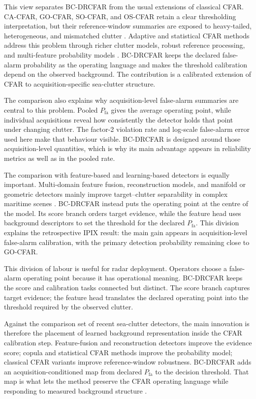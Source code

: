 \documentclass[preprint,12pt]{elsarticle}
\begin{document}
This view separates BC-DRCFAR from the usual extensions of classical CFAR.
CA-CFAR, GO-CFAR, SO-CFAR, and OS-CFAR retain a clear thresholding
interpretation, but their reference-window summaries are exposed to heavy-tailed,
heterogeneous, and mismatched clutter
\cite{hansen1980go,rohling1983cfar,barkat1989multiple}. Adaptive and statistical
CFAR methods address this problem through richer clutter models, robust
reference processing, and multi-feature probability models
\cite{xue2022adaptive,zhao2019dbscan,wen2024gev,li2025copula,jiang2025twodcfar}.
BC-DRCFAR keeps the declared false-alarm probability as the operating language
and makes the threshold calibration depend on the observed background. The
contribution is a calibrated extension of CFAR to acquisition-specific
sea-clutter structure.

The comparison also explains why acquisition-level false-alarm summaries are
central to this problem. Pooled $P_{\mathrm{fa}}$ gives the average operating
point, while individual acquisitions reveal how consistently the detector holds
that point under changing clutter. The factor-2 violation rate and log-scale
false-alarm error used here make that behaviour visible. BC-DRCFAR is designed
around those acquisition-level quantities, which is why its main advantage
appears in reliability metrics as well as in the pooled rate.

The comparison with feature-based and learning-based detectors is equally
important. Multi-domain feature fusion, reconstruction models, and manifold or
geometric detectors mainly improve target--clutter separability in complex
maritime scenes \cite{wen2022spatiotemporal,wang2025twostage,chen2026mspmig}.
BC-DRCFAR instead puts the operating point at the centre of the model. Its score
branch orders target evidence, while the feature head uses background
descriptors to set the threshold for the declared $P_{\mathrm{fa}}$. This
division explains the retrospective IPIX result: the main gain appears in
acquisition-level false-alarm calibration, with the primary detection
probability remaining close to GO-CFAR.

This division of labour is useful for radar deployment. Operators choose a
false-alarm operating point because it has operational meaning. BC-DRCFAR keeps
the score and calibration tasks connected but distinct. The score branch
captures target evidence; the feature head translates the declared operating
point into the threshold required by the observed clutter.

Against the comparison set of recent sea-clutter detectors, the main innovation
is therefore the placement of learned background representation inside the CFAR
calibration step. Feature-fusion and reconstruction detectors improve the
evidence score; copula and statistical CFAR methods improve the probability
model; classical CFAR variants improve reference-window robustness. BC-DRCFAR
adds an acquisition-conditioned map from declared $P_{\mathrm{fa}}$ to the
decision threshold. That map is what lets the method preserve the CFAR operating
language while responding to measured background structure
\cite{wen2022spatiotemporal,liang2022unsupervised,li2025copula,jiang2025twodcfar,chen2025multidomain}.
\end{document}
